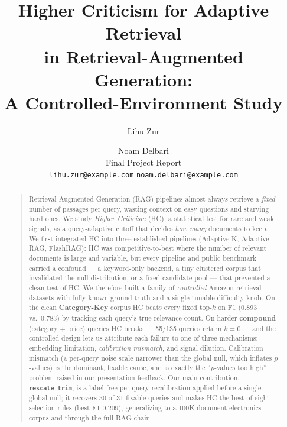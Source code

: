 \documentclass[letterpaper]{article}
\title{Higher Criticism for Adaptive Retrieval\\in Retrieval-Augmented Generation:\\
A Controlled-Environment Study}
\author{Lihu Zur \and Noam Delbari\\
Final Project Report\\
\texttt{lihu.zur@example.com} \quad \texttt{noam.delbari@example.com}\\
}
\newcommand{\CatHCF}{0.893}
\newcommand{\CatFixF}{0.783}
\newcommand{\AcHCF}{0.209}
\newcommand{\Nfail}{55}
\begin{document}
\maketitle

\begin{abstract}
\begin{quote}
Retrieval-Augmented Generation (RAG) pipelines almost always retrieve
a \emph{fixed} number of passages per query, wasting context on easy
questions and starving hard ones. We study \emph{Higher Criticism}
(HC), a statistical test for rare and weak signals, as a query-adaptive
cutoff that decides \emph{how many} documents to keep. We first
integrated HC into three established pipelines (Adaptive-K,
Adaptive-RAG, FlashRAG): HC was competitive-to-best where the number
of relevant documents is large and variable, but every pipeline and
public benchmark carried a confound --- a keyword-only backend, a tiny
clustered corpus that invalidated the null distribution, or a fixed
candidate pool --- that prevented a clean test of HC. We therefore
built a family of \emph{controlled} Amazon retrieval datasets with
fully known ground truth and a single tunable difficulty knob. On the
clean \textbf{Category-Key} corpus HC beats every fixed top-$k$ on F1
(\CatHCF{} vs.\ \CatFixF{}) by tracking each query's true relevance
count. On harder \textbf{compound} (category $+$ price) queries HC
breaks --- \Nfail{}/135 queries return $k\!=\!0$ --- and the controlled
design lets us attribute each failure to one of three mechanisms:
embedding limitation, \emph{calibration mismatch}, and signal
dilution. Calibration mismatch (a per-query noise scale narrower than
the global null, which inflates $p$-values) is the dominant, fixable
cause, and is exactly the ``$p$-values too high'' problem raised in our
presentation feedback. Our main contribution, \textbf{\texttt{rescale\_trim}},
is a label-free per-query recalibration applied before a single global
null; it recovers 30 of 31 fixable queries and makes HC the best of
eight selection rules (best F1 \AcHCF), generalizing to a 100K-document
electronics corpus and through the full RAG chain.
\end{quote}
\end{abstract}

\end{document}
